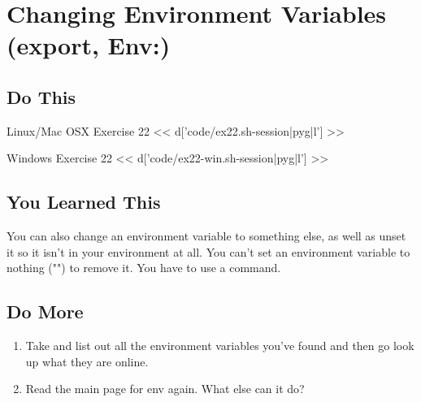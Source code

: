 \chapter{Changing Environment Variables (export, Env:)}

\section{Do This}

\begin{code}{Linux/Mac OSX Exercise 22}
<< d['code/ex22.sh-session|pyg|l'] >>
\end{code}

\begin{code}{Windows Exercise 22}
<< d['code/ex22-win.sh-session|pyg|l'] >>
\end{code}

\section{You Learned This}

You can also change an environment variable to something else, as well as
unset it so it isn't in your environment at all.  You can't set an
environment variable to nothing ("") to remove it.  You have to use a 
command.

\section{Do More}

\begin{enumerate}
\item Take and list out all the environment variables you've found and 
    then go look up what they are online.
\item Read the main page for env again.  What else can it do?
\end{enumerate}

